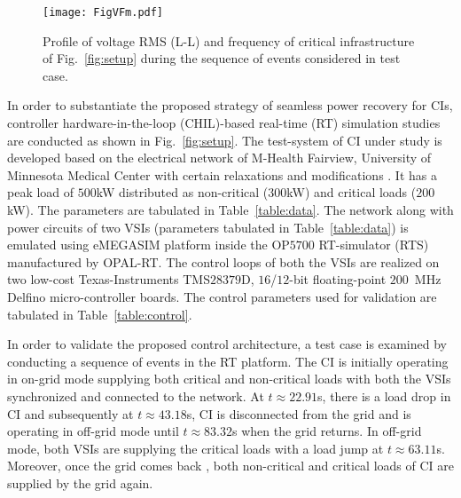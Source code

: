 \documentclass[journal]{IEEEtran}
\begin{document}
\begin{figure*}[t]
	\centering
    \texttt{[image: FigVFm.pdf]}%
	\caption{Profile of voltage RMS (L-L) and frequency of critical infrastructure of Fig.~\ref{fig:setup} during the sequence of events considered in test case.}
	\label{fig:VF}
\end{figure*}
In order to substantiate the proposed strategy of seamless power recovery for CIs, controller hardware-in-the-loop (CHIL)-based real-time (RT) simulation studies are conducted as shown in Fig.~\ref{fig:setup}. The test-system of CI under study is developed based on the electrical network of M-Health Fairview, University of Minnesota Medical Center with certain relaxations and modifications \cite{umn}. It has a peak load of $500$kW distributed as non-critical ($300$kW) and critical loads ($200$kW). The parameters are tabulated in Table~\ref{table:data}. The network along with power circuits of two VSIs (parameters tabulated in Table~\ref{table:data}) is emulated using eMEGASIM platform inside the OP$5700$ RT-simulator (RTS) manufactured by OPAL-RT. The control loops of both the VSIs are realized on two low-cost Texas-Instruments TMS$28379$D, $16$/$12$-bit floating-point $200$~MHz Delfino micro-controller boards. The control parameters used for validation are tabulated in Table~\ref{table:control}. 
\par In order to validate the proposed control architecture, a test case is examined by conducting a sequence of events in the RT platform. The CI is initially operating in on-grid mode supplying both critical and non-critical loads with both the VSIs synchronized and connected to the network. At $t\approx22.91$s, there is a load drop in CI and subsequently at $t\approx43.18$s, CI is disconnected from the grid and is operating in off-grid mode until $t\approx83.32$s when the grid returns. In off-grid mode, both VSIs are supplying the critical loads with a load jump at $t\approx63.11$s. Moreover, once the grid comes back \cite{gridsync}, both non-critical and critical loads of CI are supplied by the grid again. 
\end{document}
